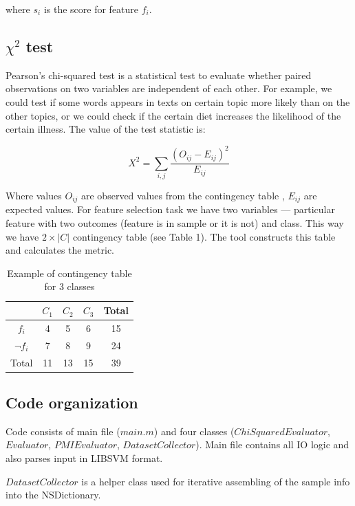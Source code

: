 \documentclass[12pt, english, a4paper]{extarticle}
\begin{document}
where $s_i$ is the score for feature $f_i$.

\subsection{ $\chi^2$ test }

Pearson's chi-squared test \cite{8} is a statistical test to evaluate whether paired observations on two variables are independent of each other. For example, we could test if some words appears in texts on certain topic more likely than on the other topics, or we could check if the certain diet increases the likelihood of the certain illness.
The value of the test statistic is:

\begin{equation}
    X^2 = \sum_{i,j} \frac { \left( O_{ij} - E_{ij} \right)^2 } { E_{ij} }
\end{equation}

Where values $O_{ij}$ are observed values from the contingency table \cite{9}, $E_{ij}$ are expected values. For feature selection task we have two variables — particular feature with two outcomes (feature is in sample or it is not) and class. This way we have $2\times\left|C\right|$ contingency table (see Table 1). The tool constructs this table and calculates the metric.

\begin{table}[h]
  \centering
  \begin{tabular}{ | c | c | c | c | c | }
    \hline
    & $C_1$ & $C_2$ & $C_3$ & Total \\ \hline
    $f_i$ & 4 & 5 & 6 & 15 \\ \hline
    $\neg f_i$ & 7 & 8 & 9 & 24 \\ \hline
    Total & 11 & 13 & 15 & 39 \\
    \hline
  \end{tabular}
  \caption{Example of contingency table for 3 classes}
\end{table}

\subsection{ Code organization }

Code consists of main file ($main.m$) and four classes ($ChiSquaredEvaluator$, $Evaluator$, $PMIEvaluator$, $DatasetCollector$). Main file contains all IO logic and also parses input in LIBSVM format. 

$DatasetCollector$ is a helper class used for iterative assembling of the sample info into the NSDictionary. 
\end{document}
